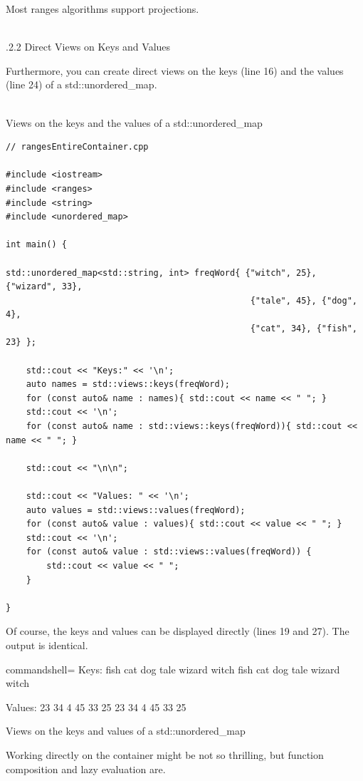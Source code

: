 Most ranges algorithms support projections.

\hspace*{\fill} \\ %
.2.2\hspace{0.2cm} Direct Views on Keys and Values

Furthermore, you can create direct views on the keys (line 16) and the values (line 24) of a std::unordered\_map.

\hspace*{\fill} \\ %
\noindent
Views on the keys and the values of a std::unordered\_map
\begin{lstlisting}[style=styleCXX]
// rangesEntireContainer.cpp

#include <iostream>
#include <ranges>
#include <string>
#include <unordered_map>

int main() {

std::unordered_map<std::string, int> freqWord{ {"witch", 25}, {"wizard", 33},
												{"tale", 45}, {"dog", 4},
												{"cat", 34}, {"fish", 23} };

	std::cout << "Keys:" << '\n';
	auto names = std::views::keys(freqWord);
	for (const auto& name : names){ std::cout << name << " "; }
	std::cout << '\n';
	for (const auto& name : std::views::keys(freqWord)){ std::cout << name << " "; }
	
	std::cout << "\n\n";

	std::cout << "Values: " << '\n';
	auto values = std::views::values(freqWord);
	for (const auto& value : values){ std::cout << value << " "; }
	std::cout << '\n';
	for (const auto& value : std::views::values(freqWord)) {
		std::cout << value << " ";
	}

}
\end{lstlisting}

Of course, the keys and values can be displayed directly (lines 19 and 27). The output is identical.

\begin{tcblisting}{commandshell={}}
Keys:
fish cat dog tale wizard witch
fish cat dog tale wizard witch

Values:
23 34 4 45 33 25
23 34 4 45 33 25
\end{tcblisting}

\begin{center}
Views on the keys and values of a std::unordered\_map
\end{center}

Working directly on the container might be not so thrilling, but function composition and lazy evaluation are.

